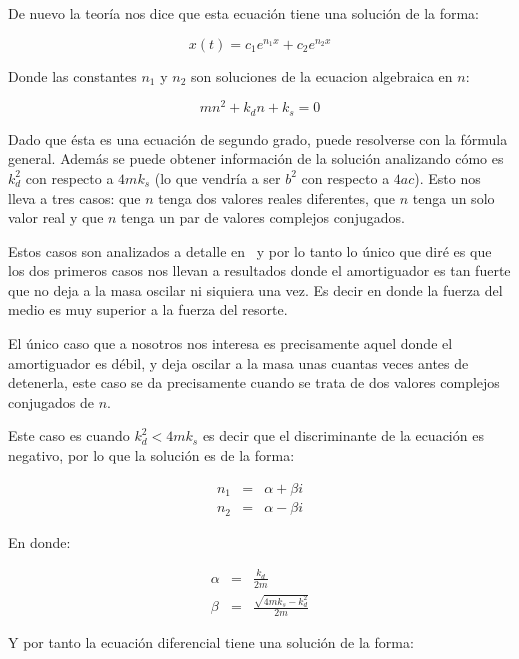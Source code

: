 De nuevo la teoría nos dice que esta ecuación tiene una solución de la forma:

\begin{equation}
x(t) = c_1 e^{n_1 x} + c_2 e^{n_2 x} \nonumber
\end{equation}

Donde las constantes $n_1$ y $n_2$ son soluciones de la ecuacion algebraica en $n$:

\begin{equation}
m n^2 +  k_d n + k_s = 0
\end{equation}

Dado que ésta es una ecuación de segundo grado, puede resolverse con la fórmula general. Además se puede obtener información de la solución analizando cómo es $k_d^2$ con respecto a $4 m k_s$ (lo que vendría a ser $b^2$ con respecto a $4ac$). Esto nos lleva a tres casos: que $n$ tenga dos valores reales diferentes, que $n$ tenga un solo valor real y que $n$ tenga un par de valores complejos conjugados.

Estos casos son analizados a detalle en~\cite{Ross:Ecuaciones} y por lo tanto lo único que diré es que los dos primeros casos nos llevan a resultados donde el amortiguador es tan fuerte que no deja a la masa oscilar ni siquiera una vez. Es decir en donde la fuerza del medio es muy superior a la fuerza del resorte.

El único caso que a nosotros nos interesa es precisamente aquel donde el amortiguador es débil, y deja oscilar a la masa unas cuantas veces antes de detenerla, este caso se da precisamente cuando se trata de dos valores complejos conjugados de $n$. 

Este caso es cuando $k_d^2 < 4 m k_s$ es decir que el discriminante de la ecuación es negativo, por lo que la solución es de la forma:

\begin{eqnarray}
n_1 & = & \alpha + \beta i \nonumber \\
n_2 & = & \alpha - \beta i \nonumber
\end{eqnarray}

En donde:

\begin{eqnarray}
\alpha & = & \frac{k_d}{2m} \nonumber \\
\beta  & = & \frac{\sqrt{4 m k_s - k_d^2}}{2m} \nonumber
\end{eqnarray}

Y por tanto la ecuación diferencial tiene una solución de la forma:

